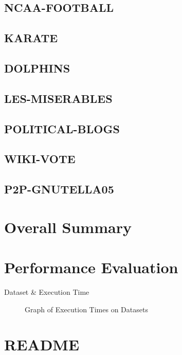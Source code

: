 \documentclass{report}
\begin{document}
\subsection{NCAA-FOOTBALL}
\subsection{KARATE}
\subsection{DOLPHINS}
\subsection{LES-MISERABLES}
\subsection{POLITICAL-BLOGS}
\subsection{WIKI-VOTE}
\subsection{P2P-GNUTELLA05}

\section{Overall Summary}
\section{Performance Evaluation}
\begin{table}
  \centering
  \begin{tabular}{}
    \toprule
    Dataset & Execution Time\\
    \midrule
    \bottomrule
  \end{tabular}
  \caption{Execution Times on Datasets}
  \label{execution-times-table}
\end{table}
\begin{figure}
  \centering
  
  \caption{Graph of Execution Times on Datasets}
  \label{execution-times-graph}
\end{figure}
\appendix
\section{README}
\end{document}
